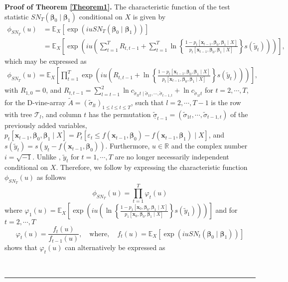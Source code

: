 \documentclass[harvard,11pt]{article}
\newcommand{\E}{\mathbb{E}}
\newenvironment{proof}[1][Proof]{\textbf{#1.} }{\  \rule{0.5em}{0.5em}}
\begin{document}
\begin{proof}[Proof of Theorem \protect\ref{Theorem1}]
 The characteristic function of the test statistic $SN_T(\bm{\beta}_0\mid\bm{\beta}_1)$ conditional on $X$ is given by
\begingroup
\allowdisplaybreaks
\begin{align*}
\phi_{SN_T}(u)&=\mathbb{E}_{X}\left[\exp(iu SN_T(\bm{\beta}_0\mid\bm{\beta}_1))\right]\\
&=\E_X\left[\exp\left(iu\left(\sum\limits_{t=1}^T R_{t,t-1}+\sum\limits_{t=1}^{T}\ln\left\{\frac{1-p_t[\bm{x}_{t-1},\bm{\beta}_0,\bm{\beta}_1\mid X]}{p_t[\bm{x}_{t-1},\bm{\beta}_0,\bm{\beta}_1\mid X]}\right\}s(\tilde{y}_t)\right)\right)\right],
\end{align*}
\endgroup
which may be expressed as
\begingroup
\allowdisplaybreaks
\begin{align*}
\phi_{SN_T}(u)=\E_X\left[\prod\limits_{t=1}^{T}\exp\left(iu\left(R_{t,t-1}+\ln\left\{\frac{1-p_t[\bm{x}_{t-1},\bm{\beta}_0,\bm{\beta}_1\mid X]}{p_t[\bm{x}_{t-1},\bm{\beta}_0,\bm{\beta}_1\mid X]}\right\}s(\tilde{y}_t)\right)\right)\right],
\end{align*}
\endgroup
with $R_{1,0}=0$, and $R_{t,t-1}=\sum\limits_{l=t-1}^{2}\ln c_{\tilde{\sigma}_{lt}t\mid \tilde{\sigma}_{1t},\cdots,\tilde{\sigma}_{t-1,t}}+\ln c_{\tilde{\sigma}_{1t}t}$ for $t=2,\cdots,T$, for the D-vine-array $\tilde{A}=(\tilde{\sigma}_{lt})_{1\leq l\leq t\leq T}$, such that $l=2,\cdots,T-1$ is the row with tree $\mathcal{T}_l$, and column $t$ has the permutation $\tilde{\underline{\sigma}}_{t-1}=(\tilde{\sigma}_{1t},\cdots,\tilde{\sigma}_{t-1,t})$ of the previously added variables, $p_t[\bm{x}_{t-1},\bm{\beta}_0,\bm{\beta}_1\mid X]=P_t[\varepsilon_t\leq f(\bm{x}_{t-1},\bm{\beta}_0)-f(\bm{x}_{t-1},\bm{\beta}_1)\mid X]$, and $s(\tilde{y}_t)=s(y_t-f(\bm{x}_{t-1},\bm{\beta}_0))$. Furthermore, $u\in\mathbb{R}$ and the complex number $i=\sqrt{-1}$. Unlike \citet{dufour2010exact}, $\tilde{y}_t$ for $t=1,\cdots,T$ are no longer necessarily independent conditional on $X$. Therefore, we follow \citet{heinrich1982factorization} by expressing the characteristic function $\phi_{SN_T}(u)$ as follows
\[
\phi_{SN_T}(u)=\prod\limits_{t=1}^{T}\varphi_t(u)
\]
where $\varphi_1(u)=\E_X\left[\exp(iu\left(\ln\left\{\frac{1-p_1[\bm{x}_{0},\bm{\beta}_0,\bm{\beta}_1\mid X]}{p_1[\bm{x}_{0},\bm{\beta}_0,\bm{\beta}_1\mid X]}\right\}s(\tilde{y}_1)\right))\right]$ and for $t=2,\cdots,T$
\[
\varphi_t(u)=\frac{f_t(u)}{f_{t-1}(u)},\quad\text{where},\quad f_t(u)=\E_X\left[\exp(iuSN_t(\bm{\beta}_0\mid\bm{\beta}_1))\right]
\] 
\citet{heinrich1982factorization} shows that $\varphi_t(u)$ can alternatively be expressed as

\end{proof}
\end{document}
